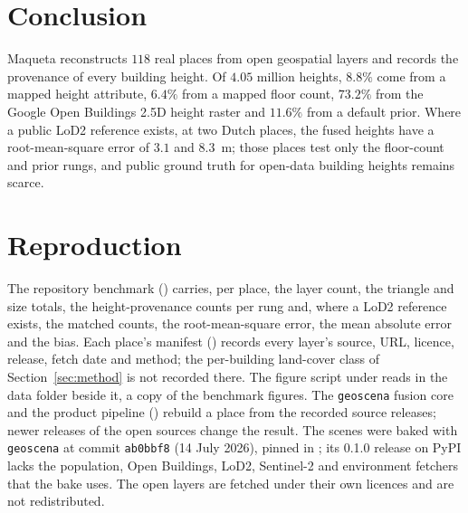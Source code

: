\documentclass[journal]{IEEEtran}
\begin{document}
\section{Conclusion}

Maqueta reconstructs $118$ real places from open geospatial layers and records the provenance of every building
height. Of $4.05$ million heights, $8.8\%$ come from a mapped height attribute, $6.4\%$ from a mapped floor count,
$73.2\%$ from the Google Open Buildings 2.5D height raster and $11.6\%$ from a default prior. Where a public LoD2
reference exists, at two Dutch places, the fused heights have a root-mean-square error of $3.1$ and $8.3$~m; those
places test only the floor-count and prior rungs, and public ground truth for open-data building heights remains
scarce.

\appendices
\section{Reproduction}\label{app:repro}

The repository benchmark () carries, per place, the layer count, the triangle and
size totals, the height-provenance counts per rung and, where a LoD2 reference exists, the matched counts, the
root-mean-square error, the mean absolute error and the bias. Each place's manifest
() records every layer's source, URL, licence, release, fetch date and
method; the per-building land-cover class of Section~\ref{sec:method} is not recorded there. The figure script under  reads  in the data folder
beside it, a copy of the benchmark figures. The \texttt{geoscena} fusion core and the product pipeline
() rebuild a place from the recorded source releases; newer releases of the open sources change
the result. The scenes were baked with \texttt{geoscena} at commit \texttt{ab0bbf8} (14 July 2026), pinned in
; its 0.1.0 release on PyPI lacks the population, Open Buildings, LoD2,
Sentinel-2 and environment fetchers that the bake uses. The open layers are fetched under their own licences and are not redistributed.

\balance
\end{document}
